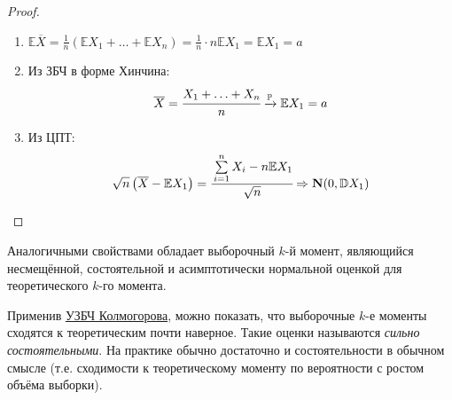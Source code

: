 \begin{proof}
\begin{enumerate}[label={\arabic*.}]
    \item $\mathbb{E} \overline{X}=\frac{1}{n}(\mathbb{E} X_{1}+\ldots+\mathbb{E} X_{n})=\frac{1}{n} \cdot n \mathbb{E} X_{1}=\mathbb{E} X_{1}=a$
    \item Из ЗБЧ в форме Хинчина:
    \begin{equation*}
        \overline{X}
        = \cfrac{X_{1}+\ldots+X_{n}}{n} \xrightarrow[]{\mathbb{P}} \mathbb{E} X_{1} 
        = a
    \end{equation*}

    \item Из ЦПТ:
    \begin{equation*}
        \sqrt{n}\left(\overline{X}-\mathbb{E} X_{1}\right) 
        = \cfrac{\sum\limits_{i=1}^{n} X_{i}-n \mathbb{E} X_{1}}{\sqrt{n}} 
        \Rightarrow \mathbf{N}(0, \mathbb{D} X_{1})
    \end{equation*}
\end{enumerate}
\end{proof}

\begin{rmrk}
    Аналогичными свойствами обладает выборочный $k$-й момент, являющийся несмещённой, состоятельной и асимптотически нормальной оценкой для теоретического $k$-го момента.
\end{rmrk}

\begin{rmrk}
    Применив \hyperlink{SLLN}{УЗБЧ Колмогорова}, можно показать, что выборочные $k$-е моменты сходятся к теоретическим почти наверное. Такие оценки называются {\it сильно состоятельными}. На практике обычно достаточно и состоятельности в обычном смысле (т.е. сходимости к теоретическому моменту по вероятности с ростом объёма выборки).
\end{rmrk}

